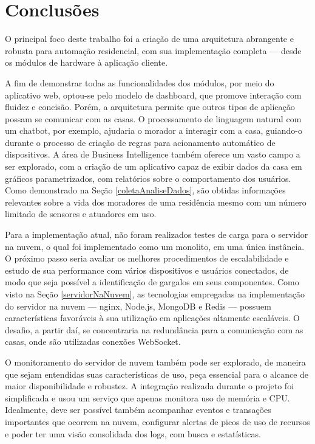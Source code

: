 \chapter{Conclusões}

O principal foco deste trabalho foi a criação de uma arquitetura abrangente e robusta para automação residencial, com sua implementação completa --- desde os módulos de hardware à aplicação cliente.

A fim de demonstrar todas as funcionalidades dos módulos, por meio do aplicativo web, optou-se pelo modelo de dashboard, que promove interação com fluidez e concisão. Porém, a arquitetura permite que outros tipos de aplicação possam se comunicar com as casas. O processamento de linguagem natural com um chatbot, por exemplo, ajudaria o morador a interagir com a casa, guiando-o durante o processo de criação de regras para acionamento automático de dispositivos. A área de Business Intelligence também oferece um vasto campo a ser explorado, com a criação de um aplicativo capaz de exibir dados da casa em gráficos parametrizados, com relatórios sobre o comportamento dos usuários. Como demonstrado na Seção \ref{coletaAnaliseDados}, são obtidas informações relevantes sobre a vida dos moradores de uma residência mesmo com um número limitado de sensores e atuadores em uso.

Para a implementação atual, não foram realizados testes de carga para o servidor na nuvem, o qual foi  implementado como um monolito, em uma única instância. O próximo passo seria avaliar os melhores procedimentos de escalabilidade e estudo de sua performance com vários dispositivos e usuários conectados, de modo que seja possível a identificação de gargalos em seus componentes. Como visto na Seção \ref{servidorNaNuvem}, as tecnologias empregadas na implementação do servidor na nuvem --- nginx, Node.js, MongoDB e Redis --- possuem características favoráveis à sua utilização em aplicações altamente escaláveis.  O desafio, a partir daí, se concentraria na redundância para a comunicação com as casas, onde são utilizadas conexões WebSocket.

O monitoramento do servidor de nuvem também pode ser explorado, de maneira que sejam entendidas suas características de uso, peça essencial para o alcance de maior disponibilidade e robustez. A integração realizada durante o projeto foi simplificada e usou um serviço que apenas monitora uso de memória e CPU. Idealmente, deve ser possível também acompanhar eventos e transações importantes que ocorrem na nuvem, configurar alertas de picos de uso de recursos e poder ter uma visão consolidada dos logs, com busca e estatísticas.

